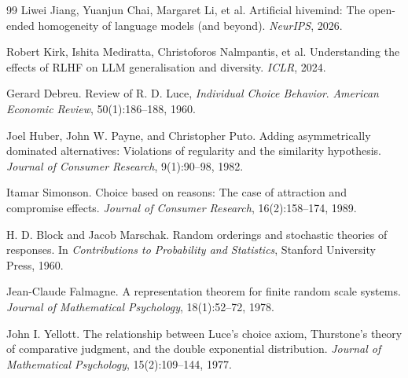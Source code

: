 \documentclass[11pt]{article}
\begin{document}
\begin{thebibliography}{99}
Liwei Jiang, Yuanjun Chai, Margaret Li, et al.
Artificial hivemind: The open-ended homogeneity of language models (and
beyond).
\emph{NeurIPS}, 2026.

Robert Kirk, Ishita Mediratta, Christoforos Nalmpantis, et al.
Understanding the effects of RLHF on LLM generalisation and diversity.
\emph{ICLR}, 2024.

Gerard Debreu.
Review of R. D. Luce, \emph{Individual Choice Behavior}.
\emph{American Economic Review}, 50(1):186--188, 1960.

Joel Huber, John W. Payne, and Christopher Puto.
Adding asymmetrically dominated alternatives: Violations of regularity
and the similarity hypothesis.
\emph{Journal of Consumer Research}, 9(1):90--98, 1982.

Itamar Simonson.
Choice based on reasons: The case of attraction and compromise effects.
\emph{Journal of Consumer Research}, 16(2):158--174, 1989.

H. D. Block and Jacob Marschak.
Random orderings and stochastic theories of responses.
In \emph{Contributions to Probability and Statistics}, Stanford
University Press, 1960.

Jean-Claude Falmagne.
A representation theorem for finite random scale systems.
\emph{Journal of Mathematical Psychology}, 18(1):52--72, 1978.

John I. Yellott.
The relationship between Luce's choice axiom, Thurstone's theory of
comparative judgment, and the double exponential distribution.
\emph{Journal of Mathematical Psychology}, 15(2):109--144, 1977.

\end{thebibliography}
\end{document}

